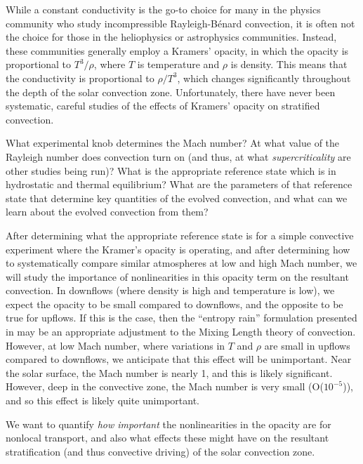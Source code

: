\documentclass[aasms,12pt]{article}
\newcommand{\RB}{Rayleigh-B\'{e}nard }
\begin{document}
While a constant
conductivity is the go-to choice for many in the physics community who study incompressible
\RB convection, it is often not the choice for those in the heliophysics or astrophysics
communities.  Instead, these communities generally employ a Kramers' opacity, in which the
opacity is proportional to $T^3/\rho$, where $T$ is temperature and $\rho$ is density.
This means that the conductivity is proportional to $\rho/T^3$, which changes significantly
throughout the depth of the solar convection zone.  Unfortunately, there have never been
systematic, careful studies of the effects of Kramers' opacity on stratified convection.

What experimental knob determines the Mach number?  At what value of the Rayleigh number
does convection turn on (and thus, at what \emph{supercriticality} are other studies
being run)?  What is the appropriate reference state which is in hydrostatic and thermal
equilibrium?  What are the parameters of that reference state that determine key quantities
of the evolved convection, and what can we learn about the evolved convection from them?

After determining what the appropriate reference state is for a simple convective experiment
where the Kramer's opacity is operating, and after determining how to systematically compare
similar atmospheres at low and high Mach number, we will study the importance of nonlinearities
in this opacity term on the resultant convection.  In downflows (where density is high
and temperature is low), we expect the opacity to be small compared to downflows, and
the opposite to be true for upflows.  If this is the case, then the ``entropy rain'' formulation
presented in \cite{brandenburg2016} may be an appropriate adjustment to the Mixing Length
theory of convection.  However, at low Mach number, where variations in $T$ and $\rho$ are small
in upflows compared to downflows, we anticipate that this effect will be unimportant.  Near the
solar surface, the Mach number is nearly 1, and this is likely significant.  However, deep in
the convective zone, the Mach number is very small (O($10^{-5}$)), and so this effect is
likely quite unimportant.

We want to quantify \emph{how important} the nonlinearities in the opacity are for 
nonlocal transport, and also what effects these might have on the resultant stratification
(and thus convective driving) of the solar convection zone.
\end{document}
